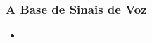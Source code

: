 \begin{frame}
	\frametitle{A Base de Sinais de Voz}
	\begin{itemize}
		\item 
	\end{itemize}
\end{frame}